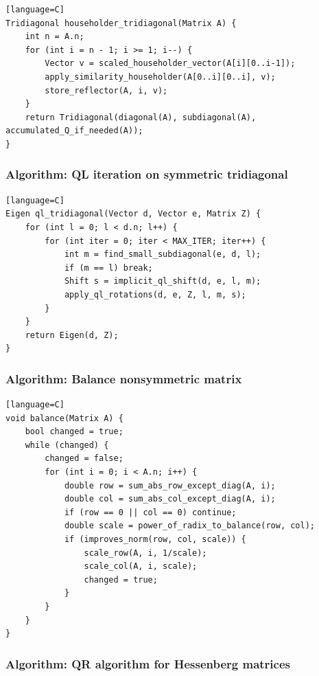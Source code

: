 \documentclass[11pt]{article}
\begin{document}
\begin{verbatim}[language=C]
Tridiagonal householder_tridiagonal(Matrix A) {
    int n = A.n;
    for (int i = n - 1; i >= 1; i--) {
        Vector v = scaled_householder_vector(A[i][0..i-1]);
        apply_similarity_householder(A[0..i][0..i], v);
        store_reflector(A, i, v);
    }
    return Tridiagonal(diagonal(A), subdiagonal(A), accumulated_Q_if_needed(A));
}
\end{verbatim}

\subsubsection{Algorithm: QL iteration on symmetric tridiagonal}\label{algorithm-ql-iteration-on-symmetric-tridiagonal}

\begin{verbatim}[language=C]
Eigen ql_tridiagonal(Vector d, Vector e, Matrix Z) {
    for (int l = 0; l < d.n; l++) {
        for (int iter = 0; iter < MAX_ITER; iter++) {
            int m = find_small_subdiagonal(e, d, l);
            if (m == l) break;
            Shift s = implicit_ql_shift(d, e, l, m);
            apply_ql_rotations(d, e, Z, l, m, s);
        }
    }
    return Eigen(d, Z);
}
\end{verbatim}

\subsubsection{Algorithm: Balance nonsymmetric matrix}\label{algorithm-balance-nonsymmetric-matrix}

\begin{verbatim}[language=C]
void balance(Matrix A) {
    bool changed = true;
    while (changed) {
        changed = false;
        for (int i = 0; i < A.n; i++) {
            double row = sum_abs_row_except_diag(A, i);
            double col = sum_abs_col_except_diag(A, i);
            if (row == 0 || col == 0) continue;
            double scale = power_of_radix_to_balance(row, col);
            if (improves_norm(row, col, scale)) {
                scale_row(A, i, 1/scale);
                scale_col(A, i, scale);
                changed = true;
            }
        }
    }
}
\end{verbatim}

\subsubsection{Algorithm: QR algorithm for Hessenberg matrices}\label{algorithm-qr-algorithm-for-hessenberg-matrices}
\end{document}
